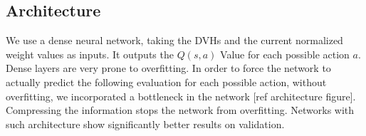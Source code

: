 %
%
%
%
%
%


\subsection{Architecture}
We use a dense neural network, taking the DVHs and the current normalized weight values as inputs.
It outputs the $Q(s, a)$ Value for each possible action $a$.
Dense layers are very prone to overfitting.
In order to force the network to actually predict the following evaluation for each possible action, without overfitting, we incorporated a bottleneck in the network [ref architecture figure].
Compressing the information stops the network from overfitting.
Networks with such architecture show significantly better results on validation.


